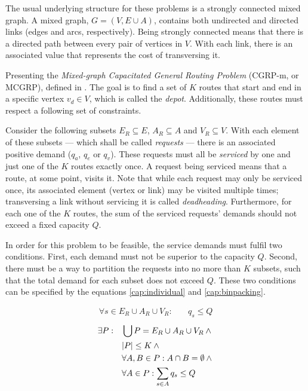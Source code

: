 The usual underlying structure for these problems is a strongly connected mixed
graph. A mixed graph, $G = (V, E \cup A)$, contains both undirected and
directed links (edges and arcs, respectively). Being strongly connected means
that there is a directed path between every pair of vertices in $V$. With each
link, there is an associated value that represents the cost of transversing it.

Presenting the \textit{Mixed-graph Capacitated General Routing Problem}
(CGRP-m, or MCGRP), defined in \citet{Cesar02,Pandit95}. The goal is to find a
set of $K$ routes that start and end in a specific vertex $v_d \in V$, which is
called the \textit{depot}. Additionally, these routes must respect a following
set of constraints.

Consider the following subsets $E_R \subseteq E$, $A_R \subseteq A$ and $V_R
\subseteq V$. With each element of these subsets --- which shall be called
\textit{requests} --- there is an associated positive demand ($q_{a}$, $q_{e}$
or $q_{v}$). These requests must all be \textit{serviced} by one and just one
of the $K$ routes exactly once. A request being serviced means that a route, at
some point, visits it. Note that while each request may only be serviced once,
its associated element (vertex or link) may be visited multiple times;
transversing a link without servicing it is called \textit{deadheading}.
Furthermore, for each one of the $K$ routes, the sum of the serviced requests'
demands should not exceed a fixed capacity $Q$.

In order for this problem to be feasible, the service demands must fulfil two
conditions. First, each demand must not be superior to the capacity $Q$.
Second, there must be a way to partition the requests into no more than $K$
subsets, such that the total demand for each subset does not exceed $Q$.  These
two conditions can be specified by the equations \eqref{cap:individual} and
\eqref{cap:binpacking}.

\begin{align}
\forall s \in E_R \cup A_R \cup V_R : & \quad q_{s} \leq Q
	\label{cap:individual}
\end{align}
\begin{align}
\exists P : &
	\quad \bigcup P = E_R \cup A_R \cup V_R \wedge \notag{} \\
	& \quad |P| \leq K \wedge \notag{} \\
	& \quad \forall A, B \in P : A \cap B = \emptyset \wedge \notag{} \\
	& \quad \forall A \in P : \sum_{s \in A} q_s \leq Q
	\label{cap:binpacking}
\end{align}

